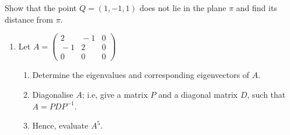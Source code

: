 \documentclass[12pt,a4paper]{article}
\def\marks#1{\hfill\rlap{~~~~~~~~~~~#1}}
\begin{document}
	
Show that the point $Q=(1,-1,1)$ does not lie in the plane $\pi$ and find its distance from $\pi$.\marks{ 2}
 \begin{enumerate}
	\item Let $A=\displaystyle\left(\begin{array}{ccc} 
	2&\!\!\!-1&0\\
	\!\!\!-1& 2&0\\
	0& 0& 0\end{array}\right)$
	
	\begin{enumerate}
		\medskip\item Determine the eigenvalues and corresponding eigenvectors of $A$.\marks{5}
		
		\medskip\item Diagonalise $A$; i.e, give a matrix $P$ and a diagonal matrix $D$, such that $A=PDP^{-1}$.\marks{3}
		
		\medskip \item Hence, evaluate $A^5$.\marks{2}
	\end{enumerate}\vspace{0.4cm}
	
\end{enumerate}
\end{document}
